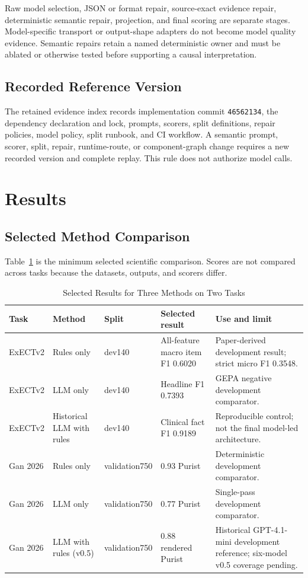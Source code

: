 \documentclass[conference]{IEEEtran}
\newcommand{\code}[1]{\texttt{#1}}
\begin{document}
Raw model selection, JSON or format repair, source-exact evidence repair,
deterministic semantic repair, projection, and final scoring are separate
stages. Model-specific transport or output-shape adapters do not become model
quality evidence. Semantic repairs retain a named deterministic owner and must
be ablated or otherwise tested before supporting a causal interpretation.

\subsection{Recorded Reference Version}

The retained evidence index records implementation commit \code{46562134}, the
dependency declaration and lock, prompts, scorers, split definitions,
repair policies, model policy, split runbook, and CI workflow. A semantic
prompt, scorer, split, repair, runtime-route, or component-graph change requires
a new recorded version and complete replay. This rule does not authorize model calls.

\section{Results}

\subsection{Selected Method Comparison}

Table~\ref{tab:reference-cells} is the minimum selected scientific comparison.
Scores are not compared across tasks because the datasets, outputs, and scorers
differ.

\begin{table}[!t]
\caption{Selected Results for Three Methods on Two Tasks}
\label{tab:reference-cells}
\centering
\scriptsize
\setlength{\tabcolsep}{2pt}
\begin{tabular}{@{}p{}p{}p{}p{}p{}@{}}
\toprule
Task & Method & Split & Selected result & Use and limit \\
\midrule
ExECTv2 & Rules only & dev140 & All-feature macro item F1 0.6020 & Paper-derived development result; strict micro F1 0.3548. \\
ExECTv2 & LLM only & dev140 & Headline F1 0.7393 & GEPA negative development comparator. \\
ExECTv2 & Historical LLM with rules & dev140 & Clinical fact F1 0.9189 & Reproducible control; not the final model-led architecture. \\
Gan 2026 & Rules only & validation750 & 0.93 Purist & Deterministic development comparator. \\
Gan 2026 & LLM only & validation750 & 0.77 Purist & Single-pass development comparator. \\
Gan 2026 & LLM with rules (v0.5) & validation750 & 0.88 rendered Purist & Historical GPT-4.1-mini development reference; six-model v0.5 coverage pending. \\
\bottomrule
\end{tabular}
\end{table}
\end{document}
